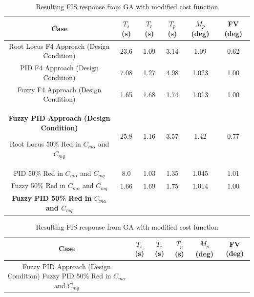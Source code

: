\begin{table}
    \centering
    \caption{Comparison table of current results with those of Bossert and Cohen}\label{t:f4}
    \begin{tabular}{|c|c|c|c|c|c|}\hline
        Case
            & $T_s$ (s) & $T_r$ (s) & $T_p$ (s) & $M_p$ (deg) & FV (deg) \\\hline
        Root Locus F4 Approach (Design Condition)
            & 23.6      & 1.09      & 3.14      & 1.09        & 0.62 \\\hline
        PID F4 Approach (Design Condition)
            & 7.08      & 1.27      & 4.98      & 1.023       & 1.00 \\\hline
        Fuzzy F4 Approach (Design Condition)
            & 1.65      & 1.68      & 1.74      & 1.013       & 1.00 \\\hline
        \textbf{Fuzzy PID Approach (Design Condition)}
            
        Root Locus 50\% Red in $C_{m\alpha}$ and $C_{mq}$
            & 25.8      & 1.16      & 3.57      & 1.42        & 0.77 \\\hline
        PID 50\% Red in $C_{m\alpha}$ and $C_{mq}$
            & 8.0       & 1.03      & 1.35      & 1.045       & 1.01 \\\hline
        Fuzzy 50\% Red in $C_{m\alpha}$ and $C_{mq}$
            & 1.66      & 1.69      & 1.75      & 1.014       & 1.00 \\\hline
        \textbf{Fuzzy PID 50\% Red in $C_{m\alpha}$ and $C_{mq}$}
            
    \end{tabular}
    \bigskip
    \bigskip
    \bigskip
    \caption{Resulting FIS response from GA with modified cost function}\label{t:f4_nos}
    \begin{tabular}{|c|c|c|c|c|c|}\hline
        Case & $T_s$ (s) & $T_r$ (s) & $T_p$ (s) & $M_p$ (deg) & FV (deg) \\\hline
        Fuzzy PID Approach (Design Condition) 
        Fuzzy PID 50\% Red in $C_{m\alpha}$ and $C_{mq}$ 
    \end{tabular}
\end{table}

